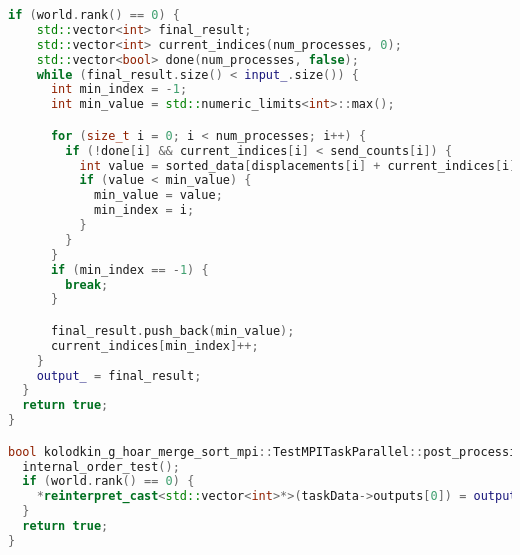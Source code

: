 \documentclass{report}
\begin{document}
\begin{lstlisting}[language=C++,caption={Приложение 2.}]
  if (world.rank() == 0) {
    std::vector<int> final_result;
    std::vector<int> current_indices(num_processes, 0);
    std::vector<bool> done(num_processes, false);
    while (final_result.size() < input_.size()) {
      int min_index = -1;
      int min_value = std::numeric_limits<int>::max();

      for (size_t i = 0; i < num_processes; i++) {
        if (!done[i] && current_indices[i] < send_counts[i]) {
          int value = sorted_data[displacements[i] + current_indices[i]];
          if (value < min_value) {
            min_value = value;
            min_index = i;
          }
        }
      }
      if (min_index == -1) {
        break;
      }

      final_result.push_back(min_value);
      current_indices[min_index]++;
    }
    output_ = final_result;
  }
  return true;
}

bool kolodkin_g_hoar_merge_sort_mpi::TestMPITaskParallel::post_processing() {
  internal_order_test();
  if (world.rank() == 0) {
    *reinterpret_cast<std::vector<int>*>(taskData->outputs[0]) = output_;
  }
  return true;
}
\end{lstlisting}
\end{document}
